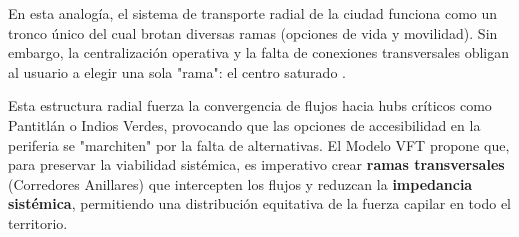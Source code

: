 En esta analogía, el sistema de transporte radial de la ciudad funciona como un tronco único del cual brotan diversas ramas 
(opciones de vida y movilidad). Sin embargo, la centralización operativa y la falta de conexiones transversales obligan al 
usuario a elegir una sola "rama": el centro saturado \cite{ramirez2025analisis}.

Esta estructura radial fuerza la convergencia de flujos hacia hubs críticos como Pantitlán o Indios Verdes, 
provocando que las opciones de accesibilidad en la periferia se "marchiten" por la falta de alternativas. 
El Modelo VFT propone que, para preservar la viabilidad sistémica, es imperativo crear \textbf{ramas transversales} 
(Corredores Anillares) que intercepten los flujos y reduzcan la \textbf{impedancia sistémica}, 
permitiendo una distribución equitativa de la fuerza capilar en todo el territorio.
